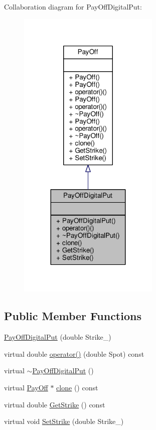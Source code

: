 Collaboration diagram for Pay\+Off\+Digital\+Put\+:
\nopagebreak
\begin{figure}[H]
\begin{center}
\leavevmode
\includegraphics[width=191pt]{classPayOffDigitalPut__coll__graph}
\end{center}
\end{figure}
\subsection*{Public Member Functions}
\begin{DoxyCompactItemize}
\item 
\hyperlink{classPayOffDigitalPut_a4c74bd1cce25134ccccffa87005aeda3}{Pay\+Off\+Digital\+Put} (double Strike\+\_\+)
\item 
virtual double \hyperlink{classPayOffDigitalPut_a8b70e39ce33fdb23e78b593d08b623ce}{operator()} (double Spot) const
\item 
virtual \hyperlink{classPayOffDigitalPut_a9ee0c37179c251132f21143b59e618bb}{$\sim$\+Pay\+Off\+Digital\+Put} ()
\item 
virtual \hyperlink{classPayOff}{Pay\+Off} $\ast$ \hyperlink{classPayOffDigitalPut_a5c3b4ad40c3cc3c6a1c9711963fa5126}{clone} () const
\item 
virtual double \hyperlink{classPayOffDigitalPut_acd323410d45f6c99a532116f8fbfbc02}{Get\+Strike} () const
\item 
virtual void \hyperlink{classPayOffDigitalPut_aaf343c40b07b7405d192416ce23b00a8}{Set\+Strike} (double Strike\+\_\+)
\end{DoxyCompactItemize}
